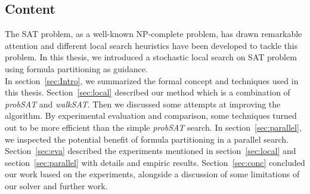 \documentclass[12pt,a4paper,twoside]{scrartcl}
\numberwithin{equation}{section}
\begin{document}
\subsection{Content} 
The SAT problem, as a well-known NP-complete problem, has drawn remarkable attention and different local search heuristics have been developed to tackle this problem. In this thesis, we introduced a stochastic local search on SAT problem using formula partitioning as guidance. \\
In section~\ref{sec:Intro}, we summarized the formal concept and techniques used in this thesis. Section~\ref{sec:local} described our method which is a combination of  \emph{probSAT} and \emph{walkSAT}. Then we  discussed some attempts at improving the algorithm. By experimental evaluation and comparison, some techniques turned out to be more efficient than the simple \emph{probSAT} search. In section~\ref{sec:parallel}, we inspected the potential benefit of formula partitioning in a parallel search. Section~\ref{sec:eva} described the experiments mentioned in section~\ref{sec:local} and section~\ref{sec:parallel} with details and empiric results.  Section~\ref{sec:conc} concluded our work based on the experiments, alongside a discussion of some limitations of our solver and further work. 
\end{document}
